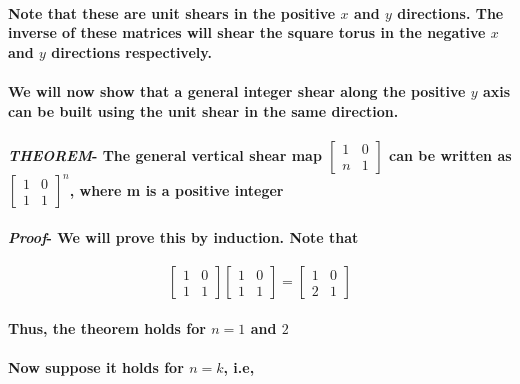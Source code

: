 \documentclass{report}
\begin{document}
\paragraph{Note that these are unit shears in the positive $x$ and $y$ directions. The inverse of these matrices will shear the square torus in the negative $x$ and $y$ directions respectively.}

\paragraph{We will now show that a general integer shear along the positive $y$ axis can be built using the unit shear in the same direction.}

\paragraph{\textit{THEOREM}- The general vertical shear map
$\begin{bmatrix}
1&0\\n&1
\end{bmatrix}$
can be written as
$\begin{bmatrix}
1&0\\1&1
\end{bmatrix}^n$,
where m is a positive integer
}

\paragraph{\textit{Proof}- We will prove this by induction. Note that}

\begin{equation}
\begin{bmatrix}
1&0\\1&1
\end{bmatrix}
\begin{bmatrix}
1&0\\1&1
\end{bmatrix}=
\begin{bmatrix}
1&0\\2&1
\end{bmatrix}
\end{equation}

\paragraph{Thus, the theorem holds for $n=1$ and $2$}

\paragraph{Now suppose it holds for $n=k$, i.e,}
\end{document}
